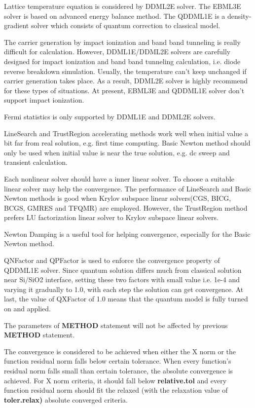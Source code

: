 \documentclass[11pt,pdftex]{article}
\begin{document}
Lattice temperature equation is considered by DDML2E solver. The
EBML3E solver is based on advanced energy balance method. The
QDDML1E is a density-gradient solver which consists of quantum
correction to classical model.

The carrier generation by impact ionization and band band tunneling
is really difficult for calculation. However, DDML1E/DDML2E solvers
are carefully designed for impact ionization and band band tunneling
calculation, i.e. diode reverse breakdown simulation. Usually, the
temperature can't keep unchanged if carrier generation takes place.
As a result, DDML2E solver is highly recommend for these types of
situations. At present, EBML3E and QDDML1E solver don't support
impact ionization.

Fermi statistics is only supported by DDML1E and DDML2E solvers.

LineSearch and TrustRegion accelerating methods work well when
initial value a bit far from real solution, e.g. first time
computing. Basic Newton method should only be used when initial
value is near the true solution, e.g. dc sweep and transient
calculation.

Each nonlinear solver should have a inner linear solver. To choose a
suitable linear solver may help the convergence. The performance of
LineSearch and Basic Newton methods is good when Krylov subspace
linear solvers(CGS, BICG, BCGS, GMRES and TFQMR) are employed.
However, the TrustRegion method prefers LU factorization linear
solver to Krylov subspace linear solvers.

Newton Damping is a useful tool for helping convergence,
especially for the Basic Newton method.

QNFactor and QPFactor is used to enforce the convergence property of QDDML1E solver.
Since quantum solution differs much from classical solution near Si/SiO2 interface, setting
these two factors with small value i.e. 1e-4 and varying it gradually to 1.0, with each
step the solution can get convergence. At last, the value of QXFactor of 1.0
means that the quantum model is fully turned on and applied.

The parameters of \textbf{METHOD} statement will not be affected by previous \textbf{METHOD} statement.

The convergence is considered to be achieved when either the X norm
or the function residual norm falls below certain tolerance. When
every function's residual norm falls small than certain tolerance,
the absolute convergence is achieved. For X norm criteria, it should
fall below \textbf{relative.tol} and every function residual norm
should fit the relaxed (with the relaxation value of
\textbf{toler.relax)} absolute converged criteria.
\end{document}
